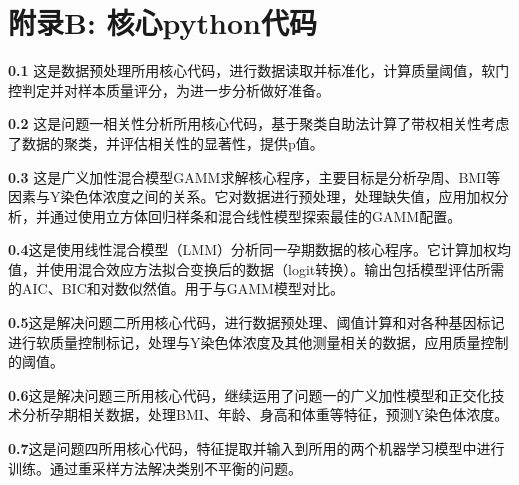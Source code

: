 {\centering \section*{附录B: 核心python代码}}

\noindent \textbf{0.1} 这是数据预处理所用核心代码，进行数据读取并标准化，计算质量阈值，软门控判定并对样本质量评分，为进一步分析做好准备。
\begin{appendices}

\end{appendices}

\noindent \textbf{0.2} 这是问题一相关性分析所用核心代码，基于聚类自助法计算了带权相关性考虑了数据的聚类，并评估相关性的显著性，提供p值。
\begin{appendices}

\end{appendices}

\noindent \textbf{0.3} 这是广义加性混合模型GAMM求解核心程序，主要目标是分析孕周、BMI等因素与Y染色体浓度之间的关系。它对数据进行预处理，处理缺失值，应用加权分析，并通过使用立方体回归样条和混合线性模型探索最佳的GAMM配置。
\begin{appendices}

\end{appendices}

 \noindent \textbf{0.4}这是使用线性混合模型（LMM）分析同一孕期数据的核心程序。它计算加权均值，并使用混合效应方法拟合变换后的数据（logit转换）。输出包括模型评估所需的AIC、BIC和对数似然值。用于与GAMM模型对比。
\begin{appendices}

\end{appendices}

 \noindent \textbf{0.5}这是解决问题二所用核心代码，进行数据预处理、阈值计算和对各种基因标记进行软质量控制标记，处理与Y染色体浓度及其他测量相关的数据，应用质量控制的阈值。
\begin{appendices}

\end{appendices}

 \noindent \textbf{0.6}这是解决问题三所用核心代码，继续运用了问题一的广义加性模型和正交化技术分析孕期相关数据，处理BMI、年龄、身高和体重等特征，预测Y染色体浓度。
\begin{appendices}

\end{appendices}

 \noindent \textbf{0.7}这是问题四所用核心代码，特征提取并输入到所用的两个机器学习模型中进行训练。通过重采样方法解决类别不平衡的问题。
\begin{appendices}

\end{appendices}

